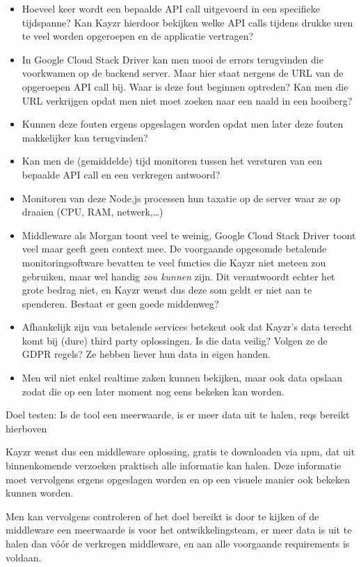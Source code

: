 \begin{itemize}
	\item Hoeveel keer wordt een bepaalde API call uitgevoerd in een specifieke tijdspanne? Kan Kayzr hierdoor bekijken welke API calls tijdens drukke uren te veel worden opgeroepen en de applicatie vertragen?
	\item In Google Cloud Stack Driver kan men mooi de errors terugvinden die voorkwamen op de backend server. Maar hier staat nergens de URL van de opgeroepen API call bij. Waar is deze fout beginnen optreden? Kan men die URL verkrijgen opdat men niet moet zoeken naar een naald in een hooiberg?
	\item Kunnen deze fouten ergens opgeslagen worden opdat men later deze fouten makkelijker kan terugvinden?
	\item Kan men de (gemiddelde) tijd monitoren tussen het versturen van een bepaalde API call en een verkregen antwoord?
	\item Monitoren van deze Node.js processen hun taxatie op de server waar ze op draaien (CPU, RAM, netwerk,…)
	\item Middleware als Morgan toont veel te weinig, Google Cloud Stack Driver toont veel maar geeft geen context mee. De voorgaande opgesomde betalende monitoringsoftware bevatten te veel functies die Kayzr niet meteen zou gebruiken, maar wel handig \textit{zou kunnen} zijn. Dit verantwoordt echter het grote bedrag niet, en Kayzr wenst dus deze som geldt er niet aan te spenderen. Bestaat er geen goede middenweg?
	\item Afhankelijk zijn van betalende services betekent ook dat Kayzr's data terecht komt bij (dure) third party oplossingen. Is die data veilig? Volgen ze de GDPR regels? Ze hebben liever hun data in eigen handen.
	\item Men wil niet enkel realtime zaken kunnen bekijken, maar ook data opslaan zodat die op een later moment nog eens bekeken kan worden.
\end{itemize}

Doel testen: Is de tool een meerwaarde, is er meer data uit te halen, reqs bereikt hierboven

Kayzr wenst dus een middleware oplossing, gratis te downloaden via npm, dat uit binnenkomende verzoeken praktisch alle informatie kan halen. Deze informatie moet vervolgens ergens opgeslagen worden en op een visuele manier ook bekeken kunnen worden. 

Men kan vervolgens controleren of het doel bereikt is door te kijken of de middleware een meerwaarde is voor het ontwikkelingsteam, er meer data is uit te halen dan vóór de verkregen middleware, en aan alle voorgaande requirements is voldaan.



 






 
